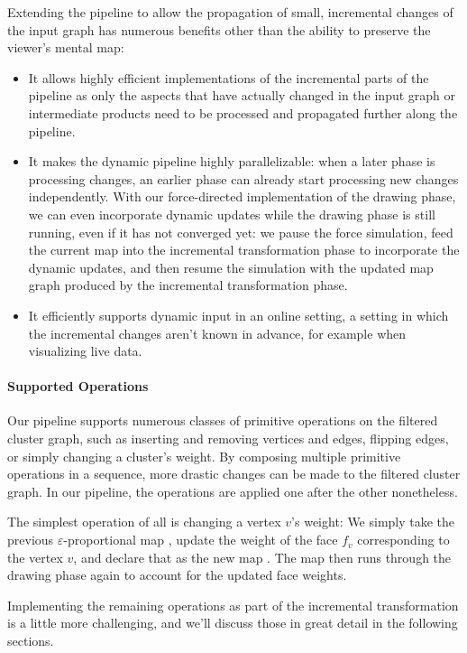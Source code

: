 Extending the pipeline to allow the propagation of small, incremental changes of the input graph has numerous benefits other than the ability to preserve the viewer's mental map:
%
\begin{itemize}
\item It allows highly efficient implementations of the incremental parts of the pipeline as only the aspects that have actually changed in the input graph or intermediate products need to be processed and propagated further along the pipeline.
\item It makes the dynamic pipeline highly parallelizable: when a later phase is processing changes, an earlier phase can already start processing new changes independently.
With our force-directed implementation of the drawing phase, we can even incorporate dynamic updates while the drawing phase is still running, even if it has not converged yet: we pause the force simulation, feed the current map  into the incremental transformation phase to incorporate the dynamic updates, and then resume the simulation with the updated map graph  produced by the incremental transformation phase.
\item It efficiently supports dynamic input in an online setting, \ie{} a setting in which the incremental changes aren't known in advance, for example when visualizing live data.
\end{itemize}



\paragraph{Supported Operations}

Our pipeline supports numerous classes of primitive operations on the filtered cluster graph, such as inserting and removing vertices and edges, flipping edges, or simply changing a cluster's weight.
By composing multiple primitive operations in a sequence, more drastic changes can be made to the filtered cluster graph.
In our pipeline, the operations are applied one after the other nonetheless.

The simplest operation of all is changing a vertex $v$'s weight:
We simply take the previous $\varepsilon$-proportional map , update the weight of the face $f_v$ corresponding to the vertex $v$, and declare that as the new map .
The map  then runs through the drawing phase again to account for the updated face weights.

Implementing the remaining operations as part of the incremental transformation is a little more challenging, and we'll discuss those in great detail in the following sections.

\clearpage

\clearpage

\clearpage

